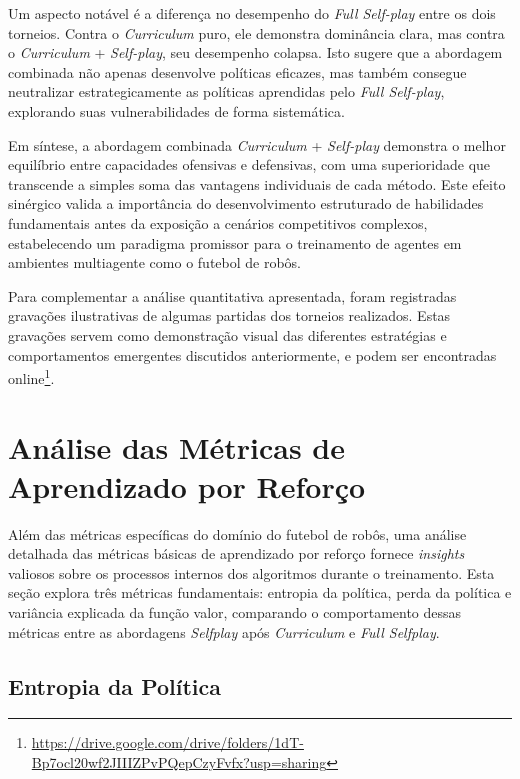 Um aspecto notável é a diferença no desempenho do \textit{Full Self-play} entre os dois torneios. Contra o \textit{Curriculum} puro, ele demonstra dominância clara, mas contra o \textit{Curriculum} + \textit{Self-play}, seu desempenho colapsa. Isto sugere que a abordagem combinada não apenas desenvolve políticas eficazes, mas também consegue neutralizar estrategicamente as políticas aprendidas pelo \textit{Full Self-play}, explorando suas vulnerabilidades de forma sistemática.

Em síntese, a abordagem combinada \textit{Curriculum} + \textit{Self-play} demonstra o melhor equilíbrio entre capacidades ofensivas e defensivas, com uma superioridade que transcende a simples soma das vantagens individuais de cada método. Este efeito sinérgico valida a importância do desenvolvimento estruturado de habilidades fundamentais antes da exposição a cenários competitivos complexos, estabelecendo um paradigma promissor para o treinamento de agentes em ambientes multiagente como o futebol de robôs.


Para complementar a análise quantitativa apresentada, foram registradas gravações ilustrativas de algumas partidas dos torneios realizados. Estas gravações servem como demonstração visual das diferentes estratégias e comportamentos emergentes discutidos anteriormente, e podem ser encontradas online\footnote{\url{https://drive.google.com/drive/folders/1dT-Bp7ocl20wf2JIIIZPvPQepCzyFvfx?usp=sharing}}.







\section{Análise das Métricas de Aprendizado por Reforço}
\label{sec:analise_metricas_aprendizado}

Além das métricas específicas do domínio do futebol de robôs, uma análise detalhada das métricas básicas de aprendizado por reforço fornece \textit{insights} valiosos sobre os processos internos dos algoritmos durante o treinamento. Esta seção explora três métricas fundamentais: entropia da política, perda da política e variância explicada da função valor, comparando o comportamento dessas métricas entre as abordagens \textit{Selfplay} após \textit{Curriculum} e \textit{Full Selfplay}.

\subsection{Entropia da Política}

